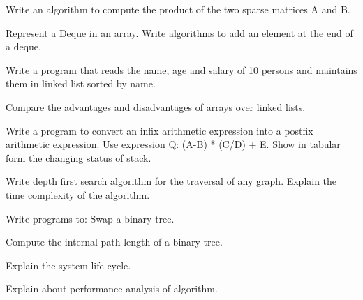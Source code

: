 \markB
\partCo

\item \iitem Write an algorithm to compute the product of the two
  sparse matrices A and B.
\Or

\newpage \again

\item Represent a Deque in an array. Write algorithms to add an 
  element at the end of a deque.
\ene

\item \iitem \iitem Write a program that reads the name, age and salary of 10 persons
  and maintains them in linked list sorted by name.
\item Compare the advantages and disadvantages of arrays over linked lists.
\ene
\Or
\item Write a program to convert an infix arithmetic expression into a postfix
  arithmetic expression. Use expression Q: (A-B) * (C/D) + E. Show in tabular form
  the changing status of stack.
\ene

\item \iitem Write depth first search algorithm for the traversal of any graph.
  Explain the time complexity of the algorithm.
\Or
\item Write programs to:
\iitem Swap a binary tree.
\item Compute the internal path length of a binary tree.
\ene\ene

\item \iitem Explain the system life-cycle.
\Or
\item Explain about performance analysis of algorithm.
\ene

\markC
\ene

